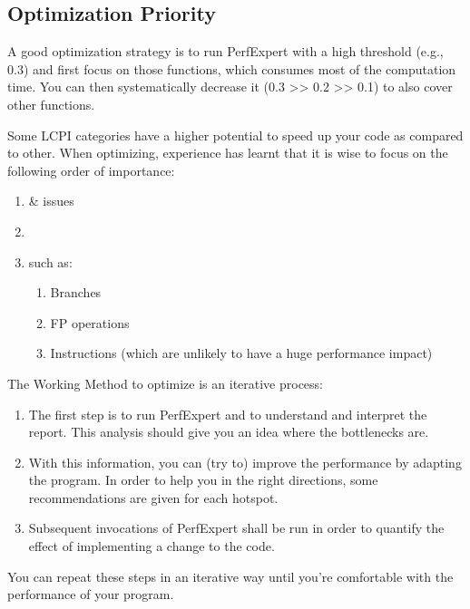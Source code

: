 \subsection{Optimization Priority}
\label{subsec:Optimization_Priority}

A good optimization strategy is to run PerfExpert with a high threshold (e.g., 0.3) and first focus on those functions, which consumes most of the computation time. You can then systematically decrease it (0.3 >> 0.2 >> 0.1) to also cover other functions.

Some LCPI categories have a higher potential to speed up your code as compared to other. When optimizing, experience has learnt that it is wise to focus on the following order of importance:

\begin{enumerate}
  \item  {} \&  issues
  \item  {}
  \item  {} such as:
  \begin{enumerate}
    \item  Branches
    \item  FP operations
    \item  Instructions (which are unlikely to have a huge performance impact)
  \end{enumerate}
\end{enumerate}

The Working Method to optimize is an iterative process:

\begin{enumerate}
  \item  {} The first step is to run PerfExpert and to understand and interpret the report. This analysis should give you an idea where the bottlenecks are.
  \item  {} With this information, you can (try to) improve the performance by adapting the program. In order to help you in the right directions, some recommendations are given for each hotspot.
  \item  {} Subsequent invocations of PerfExpert shall be run in order to quantify the effect of implementing a change to the code.
\end{enumerate}

You can repeat these steps in an iterative way until you're comfortable with the performance of your program.

